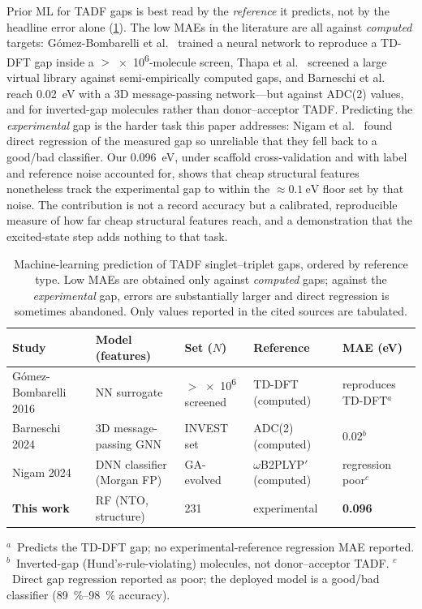 Prior ML for TADF gaps is best read by the \emph{reference} it predicts, not by
the headline error alone (\cref{tab:prior_ml}). The low MAEs in the literature are
all against \emph{computed} targets: G\'omez-Bombarelli et
al.~\cite{Gomez-Bombarelli2016} trained a neural network to reproduce a TD-DFT gap
inside a $>$\num{e6}-molecule screen, Thapa et al.~\cite{Thapa2025} screened a
large virtual library against semi-empirically computed gaps, and Barneschi et al.~\cite{Barneschi2024}
reach \qty{0.02}{\electronvolt} with a 3D message-passing network---but against
ADC(2) values, and for inverted-gap molecules rather than donor--acceptor TADF.
Predicting the \emph{experimental} gap is the harder task this paper addresses:
Nigam et al.~\cite{Nigam2024} found direct regression of the measured gap so
unreliable that they fell back to a good/bad classifier. Our
\qty{0.096}{\electronvolt}, under scaffold cross-validation and with label and
reference noise accounted for, shows that cheap structural features nonetheless
track the experimental gap to within the $\approx\qty{0.1}{\electronvolt}$ floor
set by that noise. The contribution is not a record accuracy but a calibrated,
reproducible measure of how far cheap structural features reach, and a
demonstration that the excited-state step adds nothing to that task.

\begin{table}[htbp]
  \centering
  \caption{Machine-learning prediction of TADF singlet--triplet gaps, ordered by
    reference type. Low MAEs are obtained only against \emph{computed} gaps;
    against the \emph{experimental} gap, errors are substantially larger and
    direct regression is sometimes abandoned. Only values reported in the
    cited sources are tabulated.}
  \label{tab:prior_ml}
  \small
  \begin{tabular}{lllll}
    \toprule
    Study & Model (features) & Set ($N$) & Reference & MAE (eV) \\
    \midrule
    G\'omez-Bombarelli 2016~\cite{Gomez-Bombarelli2016} & NN surrogate & $>$\num{e6} screened & TD-DFT (computed) & reproduces TD-DFT$^{a}$ \\
    Barneschi 2024~\cite{Barneschi2024} & 3D message-passing GNN & INVEST set & ADC(2) (computed) & 0.02$^{b}$ \\
    Nigam 2024~\cite{Nigam2024} & DNN classifier (Morgan FP) & GA-evolved & $\omega$B2PLYP$'$ (computed) & regression poor$^{c}$ \\
    \textbf{This work} & RF (NTO, structure) & 231 & experimental & \textbf{0.096} \\
    \bottomrule
  \end{tabular}

  \vspace{2pt}
  {\footnotesize\raggedright
   $^{a}$~Predicts the TD-DFT gap; no experimental-reference regression MAE reported.
   $^{b}$~Inverted-gap (Hund's-rule-violating) molecules, not donor--acceptor TADF.
   $^{c}$~Direct gap regression reported as poor; the deployed model is a good/bad
   classifier (\qtyrange{89}{98}{\percent} accuracy).\par}
\end{table}

